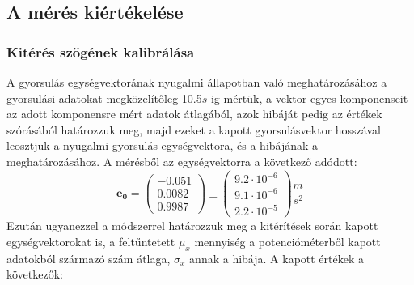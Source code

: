 \documentclass[10pt,pdftex]{report}
\begin{document}
\subsection*{A mérés kiértékelése}
\subsubsection*{Kitérés szögének kalibrálása}
A gyorsulás egységvektorának nyugalmi állapotban való meghatározásához a gyorsulási adatokat megközelítőleg 10.5$s$-ig mértük, a vektor egyes komponenseit az adott komponensre mért 
adatok átlagából, azok hibáját pedig az értékek szórásából határozzuk meg, majd ezeket a kapott gyorsulásvektor hosszával leosztjuk a nyugalmi gyorsulás egységvektora, és a hibájának 
a meghatározásához. A mérésből az egységvektorra a következő adódott:
\[
\mathbf{e_0}=
\begin{pmatrix}
    -0.051 \\
    0.0082 \\
    0.9987 
\end{pmatrix} \pm \begin{pmatrix}
    9.2\cdot 10^{-6} \\
    9.1\cdot 10^{-6} \\
    2.2\cdot 10^{-5}
\end{pmatrix}\frac{m}{s^2}
\]
Ezután ugyanezzel a módszerrel határozzuk meg a kitérítések során kapott egységvektorokat is, a feltűntetett $\mu_x$ mennyiség a potencióméterből kapott adatokból származó szám átlaga, $\sigma_x$ annak a hibája. A kapott értékek a következők:
\end{document}
